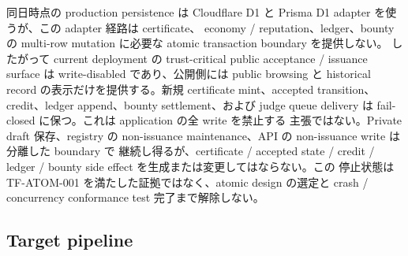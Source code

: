 \documentclass[a4paper,11pt]{ltjsarticle}
\begin{document}
同日時点の production persistence は Cloudflare D1 と Prisma D1 adapter を使うが、この adapter 経路は certificate、
economy / reputation、ledger、bounty の multi-row mutation に必要な atomic transaction boundary を提供しない。
したがって current deployment の trust-critical public acceptance / issuance surface は write-disabled であり、公開側には
public browsing と historical record の表示だけを提供する。新規 certificate mint、accepted transition、credit、ledger
append、bounty settlement、および judge queue delivery は fail-closed に保つ。これは application の全 write を禁止する
主張ではない。Private draft 保存、registry の non-issuance maintenance、API の non-issuance write は分離した boundary で
継続し得るが、certificate / accepted state / credit / ledger / bounty side effect を生成または変更してはならない。この
停止状態は TF-ATOM-001 を満たした証拠ではなく、atomic design の選定と crash / concurrency conformance test 完了まで解除しない。

\subsection{Target pipeline}
\end{document}
